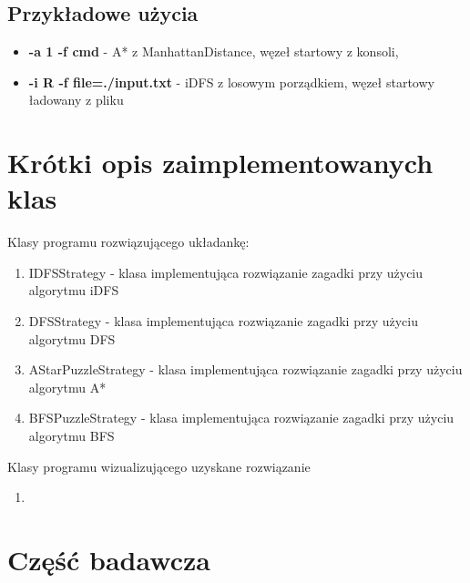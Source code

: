 \documentclass{classrep}
\begin{document}
		\subsection{Przykładowe użycia}
			\begin{itemize}
				\item \textbf{-a 1 -f cmd} - A* z ManhattanDistance, węzeł startowy z konsoli,
				\item \textbf{-i R -f file=./input.txt} - iDFS z losowym porządkiem, węzeł startowy ładowany z pliku
			\end{itemize}
	
	\section{Krótki opis zaimplementowanych klas}
		Klasy programu rozwiązującego układankę:
		\begin{enumerate}
			\item IDFSStrategy - klasa implementująca rozwiązanie zagadki przy użyciu algorytmu iDFS
			\item DFSStrategy - klasa implementująca rozwiązanie zagadki przy użyciu algorytmu DFS
			\item AStarPuzzleStrategy - klasa implementująca rozwiązanie zagadki przy użyciu algorytmu A*
			\item BFSPuzzleStrategy - klasa implementująca rozwiązanie zagadki przy użyciu algorytmu BFS
		\end{enumerate}
		Klasy programu wizualizującego uzyskane rozwiązanie
		\begin{enumerate}
			\item
		\end{enumerate}
		
		\section{Część badawcza}
\end{document}
